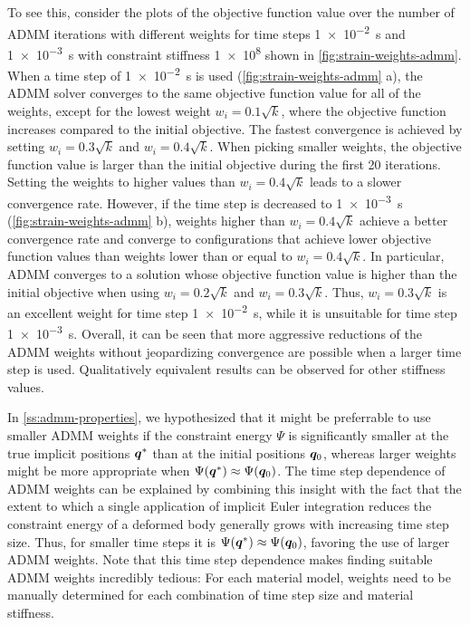 To see this, consider the plots of the objective function value over the number of ADMM iterations with 
different weights for time steps \SI{1e-2}{\second} and \SI{1e-3}{\second} with constraint stiffness \num{1e8} shown in \autoref{fig:strain-weights-admm}. When a time step 
of \SI{1e-2}{\second} is used (\cref{fig:strain-weights-admm} a), the ADMM solver converges to the same objective function value for all of the weights, except for the 
lowest weight $w_i = 0.1\sqrt{k}$, where the objective function increases compared to the initial objective. The fastest convergence is achieved by setting $w_i = 0.3\sqrt{k}$ and 
$w_i = 0.4\sqrt{k}$. When picking smaller weights, the objective function value is larger than the initial objective during the first 20 iterations. Setting the weights to 
higher values than $w_i = 0.4\sqrt{k}$ leads to a slower convergence rate. However, if the time step is decreased to \SI{1e-3}{\second} (\cref{fig:strain-weights-admm} b), 
weights higher than $w_i = 0.4\sqrt{k}$ achieve a better convergence rate and converge to configurations that achieve lower objective function values than weights lower than 
or equal to $w_i = 0.4\sqrt{k}$. In particular, ADMM converges to a solution whose objective function value is higher than the initial objective when using $w_i = 0.2\sqrt{k}$ and 
$w_i = 0.3\sqrt{k}$. Thus, $w_i = 0.3\sqrt{k}$ is an excellent weight for time step \SI{1e-2}{\second}, while it is unsuitable for time step \SI{1e-3}{\second}. Overall, it can be 
seen that more aggressive reductions of the ADMM weights without jeopardizing convergence are possible when a larger time step is used.
Qualitatively equivalent results can be observed for other stiffness values. 

In \autoref{ss:admm-properties}, we hypothesized that it might be preferrable to use smaller ADMM weights if the constraint energy $\Psi$ is significantly smaller at the true 
implicit positions $\bm{q}^*$ than at the initial positions $\bm{q}_0$, whereas larger weights might be more appropriate when $\Psi(\bm{q}^*) \approx \Psi(\bm{q}_0)$.
The time step dependence of ADMM weights can be explained by combining this insight with the fact that the extent to which a single application of implicit Euler integration 
reduces the constraint energy of a deformed body generally grows with increasing time step size. Thus, for smaller time steps it is 
$\Psi(\bm{q}^*) \approx \Psi(\bm{q}_0)$, favoring the use of larger ADMM weights. Note that this time step dependence 
makes finding suitable ADMM weights incredibly tedious: For each material model, weights need to be manually determined for each combination of time step size and 
material stiffness. 

